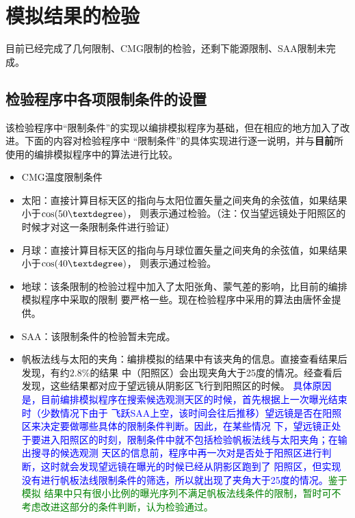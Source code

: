 \documentclass[a4paper,11pt]{ctexart}
\newcommand{\BT}[1]{\textcolor{blue}{#1}}
\newcommand{\GT}[1]{\textcolor{green}{#1}}
\begin{document}
\newpage
\section{模拟结果的检验}
目前已经完成了几何限制、CMG限制的检验，还剩下能源限制、SAA限制未完成。

\subsection{检验程序中各项限制条件的设置}
该检验程序中“限制条件”的实现以编排模拟程序为基础，但在相应的地方加入了改进。下面的内容对检验程序中
“限制条件”的具体实现进行逐一说明，并与\textbf{目前}所使用的编排模拟程序中的算法进行比较。

\begin{itemize}
\item CMG温度限制条件

\item 太阳：直接计算目标天区的指向与太阳位置矢量之间夹角的余弦值，如果结果小于$\cos(50\textdegree)$，
则表示通过检验。（注：仅当望远镜处于阳照区的时候才对这一条限制条件进行验证）

\item 月球：直接计算目标天区的指向与月球位置矢量之间夹角的余弦值，如果结果小于$\cos(40\textdegree)$，
则表示通过检验。

\item 地球：该条限制的检验过程中加入了太阳张角、蒙气差的影响，比目前的编排模拟程序中采取的限制
要严格一些。现在检验程序中采用的算法由唐怀金提供。

\item SAA：该限制条件的检验暂未完成。

\item 帆板法线与太阳的夹角：编排模拟的结果中有该夹角的信息。直接查看结果后发现，有约$2.8\%$的结果
中（阳照区）会出现夹角大于25度的情况。经查看后发现，这些结果都对应于望远镜从阴影区飞行到阳照区的时候。
\BT{具体原因是，目前编排模拟程序在搜索候选观测天区的时候，首先根据上一次曝光结束时（少数情况下由于
飞跃SAA上空，该时间会往后推移）望远镜是否在阳照区来决定要做哪些具体的限制条件判断。因此，在某些情况
下，望远镜正处于要进入阳照区的时刻，限制条件中就不包括检验帆板法线与太阳夹角；在输出搜寻的候选观测
天区的信息前，程序中再一次对是否处于阳照区进行判断，这时就会发现望远镜在曝光的时候已经从阴影区跑到了
阳照区，但实现没有进行帆板法线限制条件的筛选，所以就出现了夹角大于25度的情况。}\GT{\heiti 鉴于模拟
结果中只有很小比例的曝光序列不满足帆板法线条件的限制，暂时可不考虑改进这部分的条件判断，认为检验通过。}
\end{itemize}
\end{document}
